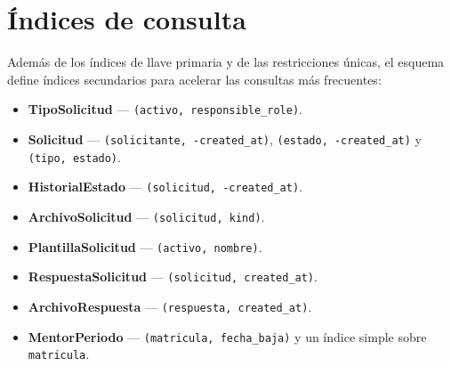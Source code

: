 \documentclass[12pt,letterpaper]{report}
\begin{document}
\section{Índices de consulta}

Además de los índices de llave primaria y de las restricciones únicas, el
esquema define índices secundarios para acelerar las consultas más frecuentes:

\begin{itemize}[leftmargin=1.4em]
  \item \textbf{TipoSolicitud} --- \texttt{(activo, responsible\_role)}.
  \item \textbf{Solicitud} --- \texttt{(solicitante, -created\_at)},
        \texttt{(estado, -created\_at)} y \texttt{(tipo, estado)}.
  \item \textbf{HistorialEstado} --- \texttt{(solicitud, -created\_at)}.
  \item \textbf{ArchivoSolicitud} --- \texttt{(solicitud, kind)}.
  \item \textbf{PlantillaSolicitud} --- \texttt{(activo, nombre)}.
  \item \textbf{RespuestaSolicitud} --- \texttt{(solicitud, created\_at)}.
  \item \textbf{ArchivoRespuesta} --- \texttt{(respuesta, created\_at)}.
  \item \textbf{MentorPeriodo} --- \texttt{(matricula, fecha\_baja)} y un índice
        simple sobre \texttt{matricula}.
\end{itemize}
\end{document}
